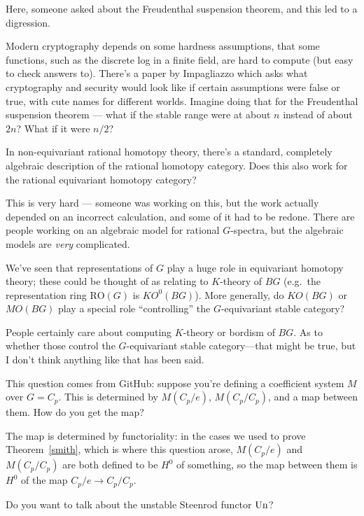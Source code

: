 Here, someone asked about the Freudenthal suspension theorem, and this led to a digression.
\begin{rem}
Modern cryptography depends on some hardness assumptions, that some functions, such as the discrete log in a finite
field, are hard to compute (but easy to check answers to). There's a paper by Impagliazzo which asks what
cryptography and security would look like if certain assumptions were false or true, with cute names for different
worlds. Imagine doing that for the Freudenthal suspension theorem --- what if the stable range were at about $n$
instead of about $2n$? What if it were $n/2$?
\end{rem}
\begin{ques}
In non-equivariant rational homotopy theory, there's a standard, completely algebraic description of the rational
homotopy category. Does this also work for the rational equivariant homotopy category?
\end{ques}
This is very hard --- someone was working on this, but the work actually depended on an incorrect calculation, and
some of it had to be redone. There are people working on an algebraic model for rational $G$-spectra, but the
algebraic models are \emph{very} complicated.
\begin{ques}
We've seen that representations of $G$ play a huge role in equivariant homotopy theory; these could be thought of
as relating to $K$-theory of $BG$ (e.g.\ the representation ring $\mathrm{RO}(G)$ is $KO^0(BG)$). More generally, do $KO(BG)$ or $MO(BG)$ play a special role ``controlling'' the $G$-equivariant stable category? %
\end{ques}
People certainly care about computing $K$-theory or bordism of $BG$. As to whether those control the $G$-equivariant stable category---that might be true, but I don't think anything like that has been said.
\begin{ques}
This question comes from GitHub: suppose you're defining a coefficient system $M$ over $G = C_p$. This is
determined by $M(C_p/e)$, $M(C_p/C_p)$, and a map between them. How do you get the map?
\end{ques}
The map is determined by functoriality: in the cases we used to prove Theorem~\ref{smith}, which is where this
question arose, $M(C_p/e)$ and $M(C_p/C_p)$ are both defined to be $H^0$ of something, so the map between them is
$H^0$ of the map $C_p/e\to C_p/C_p$.
\begin{ques}
Do you want to talk about the unstable Steenrod functor $\operatorname{Un}$?
\end{ques}

